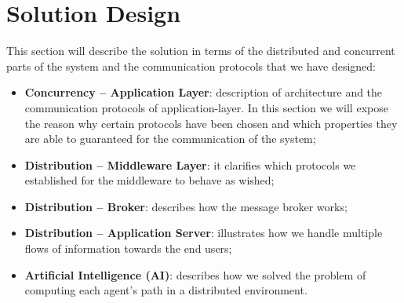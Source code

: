 \section{Solution Design}

This section will describe the solution in terms of the distributed and
concurrent parts of the system and the communication protocols that we have
designed:

\begin{itemize}
\item \textbf{Concurrency -- Application Layer}:
  description of architecture and the communication protocols
  of application-layer. In this section we
  will expose the reason why certain protocols have been chosen and which
  properties they are able to guaranteed for the communication of the system;
\item \textbf{Distribution -- Middleware Layer}:
  it clarifies which protocols
  we established for the middleware to behave as wished;
\item \textbf{Distribution -- Broker}:
  describes how the message broker works;
\item \textbf{Distribution -- Application Server}:
  illustrates how we handle multiple flows of information towards the end
  users;
\item \textbf{Artificial Intelligence (AI)}:
  describes how we solved the problem of computing each agent's path
  in a distributed environment.
\end{itemize}







